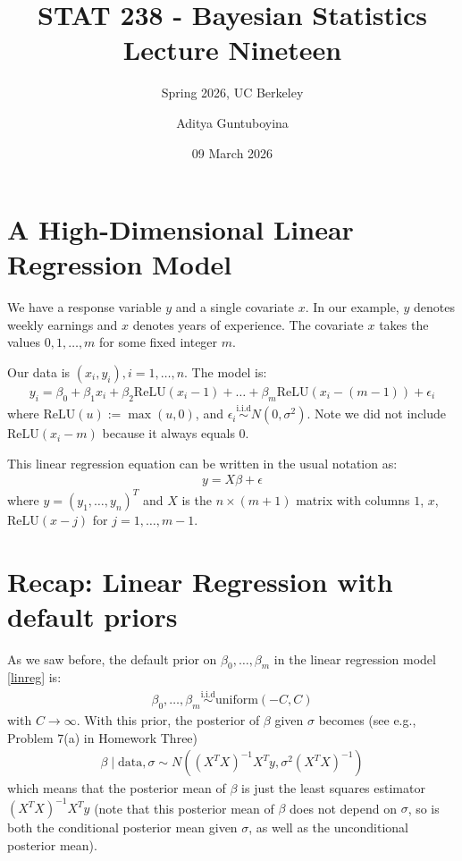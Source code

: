 \documentclass{scrartcl}
\newcommand{\relu}{{\text{ReLU}}}
\begin{document}
\title{STAT 238 - Bayesian Statistics  \\
  Lecture Nineteen} 
\subtitle{Spring 2026, UC Berkeley}

\author{Aditya Guntuboyina}


\date{09 March 2026}

\maketitle

\section{A High-Dimensional Linear Regression Model}
We have a response variable $y$ and a single covariate $x$. In our
example, $y$ denotes weekly earnings and $x$ denotes years of
experience. The covariate $x$ takes the values $0, 1, \dots, m$ for
some fixed integer $m$. 

Our data is $(x_i, y_i), i = 1, \dots, n$. The model is:
\begin{align}\label{ibm_mod}
  y_i = \beta_0 + \beta_1 x_i + \beta_2 \relu(x_i - 1) + \dots +
  \beta_{m}\relu(x_i - (m-1)) + \epsilon_i
\end{align}
where $\relu(u) := \max(u, 0)$, and $\epsilon_i
\overset{\text{i.i.d}}{\sim} N(0, \sigma^2)$. Note we did not include
$\relu(x_i - m)$ because it always equals 0. 

This linear regression equation can be written in the usual notation as:
\begin{align}\label{linreg}
  y = X \beta + \epsilon
\end{align}
where $y = (y_1, \dots, y_n)^T$ and $X$ is the $n \times (m+1)$ matrix
with columns $1$, $x$, $\relu(x - j)$ for $j = 1, \dots, m-1$.

\section{Recap: Linear Regression with default priors}

As we saw before, the default prior on $\beta_0, \dots, \beta_m$ in
the linear regression model \eqref{linreg} is:
\begin{align}\label{prior_uniform}
  \beta_0, \dots, \beta_{m} \overset{\text{i.i.d}}{\sim}
  \text{uniform}(-C, C) 
\end{align}
with $C \rightarrow \infty$. With this prior, the posterior of $\beta$
given $\sigma$ becomes (see e.g., Problem 7(a) in Homework Three)
\begin{align}\label{def_post}
  \beta \mid \text{data}, \sigma \sim N\left((X^T X)^{-1} X^T y,
  \sigma^2 (X^T X)^{-1} \right)
\end{align}
which means that the posterior mean of $\beta$ is just the least
squares estimator $(X^T X)^{-1} X^T y$ (note that this posterior mean
of $\beta$ does not depend on $\sigma$, so is both the conditional
posterior mean given $\sigma$, as well as the unconditional posterior
mean).
\end{document}
